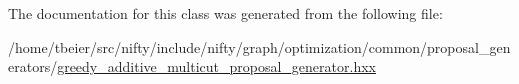 The documentation for this class was generated from the following file\+:\begin{DoxyCompactItemize}
\item 
/home/tbeier/src/nifty/include/nifty/graph/optimization/common/proposal\+\_\+generators/\hyperlink{greedy__additive__multicut__proposal__generator_8hxx}{greedy\+\_\+additive\+\_\+multicut\+\_\+proposal\+\_\+generator.\+hxx}\end{DoxyCompactItemize}
